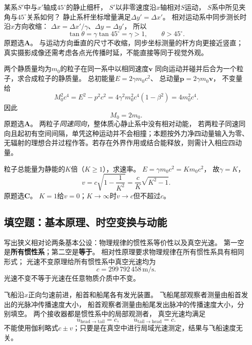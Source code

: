\problemtext 某系$S'$中与$x'$轴成$45^\circ$的静止细杆，
$S'$以非零速度沿$x$轴相对$S$运动，
$S$系中所见夹角与$45^\circ$关系如何？
\workings
静止系杆坐标增量满足$\Delta y'=\Delta x'$。
相对运动系中同步测长时沿$x$方向收缩：
$\Delta x=\Delta x'/\gamma$、$\Delta y=\Delta y'$，
所以
\[
\boxed{\tan\theta=\gamma\tan45^\circ=\gamma>1},\qquad
\boxed{\theta>45^\circ}.
\]
原题选\textbf{A}。
\crosscheck 与运动方向垂直的尺寸不收缩，同步坐标测量的杆方向更接近竖直；真实摄影成像还需考虑各点光传播时延，不能直接等同于视觉外观。

\problemtext 两个静质量均为$m_0$的粒子在同一系中以相同速度$\bm v$
同向运动并碰并后合为一个粒子，求合成粒子的静质量。
\workings
总初能量$E=2\gamma m_0c^2$、
总动量$\bm p=2\gamma m_0\bm v$，
不变量给
\[
M_0^2c^4=E^2-p^2c^2
=4\gamma^2m_0^2c^4(1-\beta^2)
=4m_0^2c^4.
\]
因此
\[
\boxed{M_0=2m_0}.
\]
原题选\textbf{A}。
\crosscheck 两粒子\emph{同速同向}，整体质心静止系中没有相对动能，
若两粒子同速同向且起初有空间间隔，单凭这种运动并不会相撞；本题按外力净四动量输入为零、无辐射的理想合并过程作答。若存在外界作用或结合能释放，则需计入相应四动量。

\problemtext 粒子总能量为静能的$K$倍（$K\ge1$），求速率。
\workings
$E=\gamma m_0c^2=Km_0c^2$，
故$\gamma=K$，
\[
\boxed{v=c\sqrt{1-\frac1{K^2}}
=\frac cK\sqrt{K^2-1}}.
\]
原题选\textbf{C}。
\crosscheck $K=1$给$v=0$；$K\to\infty$时$v\to c$但不超过$c$。

\subsection{填空题：基本原理、时空变换与动能}

\problemtext 写出狭义相对论两条基本公设：物理规律的惯性系等价性以及真空光速。
\workings
第一空是\textbf{所有惯性系}；第二空是\textbf{等于}。
相对性原理要求物理规律在所有惯性系具有相同形式；
光速不变原理给所有惯性系中真空光速均为
\[
\boxed{c=299\,792\,458\,\mathrm{m/s}}.
\]
\crosscheck 光速不变不等于光速在任意物质介质中不变。

\problemtext 飞船沿$x$正向匀速前进，船首和船尾各有发光装置。
飞船尾部观察者测量由船首发出的光脉冲传播速度大小，
船首观察者测量由船尾发出脉冲的传播速度大小，分别填空。
\workings
两个接收器都是惯性系中的局部观测者，
真空光速均满足
\[
\boxed{u_{\mathrm{head\to tail}}=c},\qquad
\boxed{u_{\mathrm{tail\to head}}=c}.
\]
\crosscheck 不能使用伽利略式$c\pm v$；只要是在真空中进行局域光速测定，结果与飞船速度无关。

